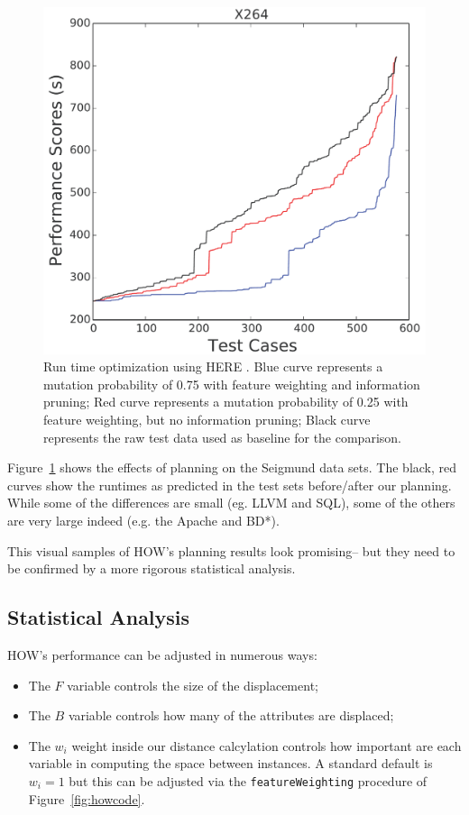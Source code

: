\documentclass[conference]{IEEEtran}
\newcommand{\bi}{\begin{itemize}}
\newcommand{\ei}{\end{itemize}}
\newcommand{\fig}[1]{Figure~\ref{fig:#1}}
\begin{document}
\begin{figure}[htbp!]
\begin{minipage}{0.30\linewidth}
\includegraphics[width=\linewidth]{_figs/X264.pdf}
\end{minipage}
\caption{Run time optimization using HERE . Blue curve represents a mutation probability of 0.75 with feature weighting and information pruning; Red curve represents a mutation probability of 0.25 with feature weighting, but no information pruning; Black curve represents the raw test data used as baseline for the comparison.}
\label{fig:pp}
\end{figure}

\fig{pp} shows the effects of planning on the Seigmund data sets. The black, red %
curves show the
runtimes as predicted in the test sets before/after our planning.  While some of the differences
are small (eg. LLVM and SQL), some of the others are very large indeed (e.g. the Apache and   BD*).
 
This visual samples of HOW's planning results look promising-- but they need to be confirmed by a
 more rigorous statistical analysis.
 
\subsection{Statistical Analysis}

HOW's performance can be adjusted in numerous ways:
\bi
\item The $F$ variable controls the size of the displacement;
\item The $B$ variable controls how many of the attributes are displaced;
\item The $w_i$ weight inside our distance calcylation controls how important are each variable in computing
     the space between instances. A standard default is $w_i=1$ but this can be adjusted via
     the {\tt featureWeighting} procedure of \fig{howcode}.
\ei
\end{document}
